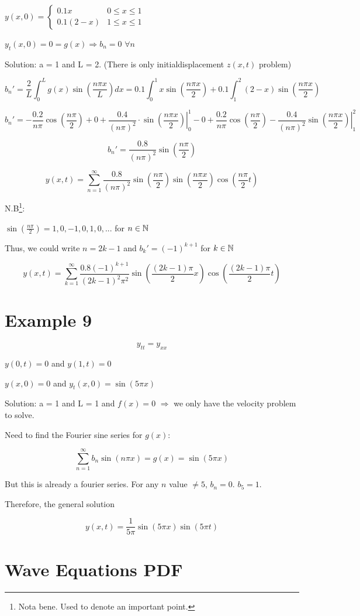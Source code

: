 \documentclass{article}
\begin{document}
$y(x,0) = \left\{ \begin{matrix} 0.1 x & 0 \leq x \leq 1 \\ 0.1(2-x) & 1 \leq x \leq 1 \end{matrix} \right.$

$y_t (x,0) = 0 = g(x) \Rightarrow b_n = 0$ $ \forall n$

Solution: a = 1 and L = 2. (There is only initialdisplacement $z(x,t)$ problem)

$$b_n' = \frac{2}{L} \int_0^L g(x) \sin \left( \frac{ n \pi x}{L} \right) dx = 0.1 \int_0^1 x \sin \left( \frac{ n \pi x}{2} \right) + 0.1\int_1^2 (2-x) \sin \left( \frac{ n \pi x}{2} \right) $$

$$b_n' = - \frac{0.2}{n \pi} \cos \left( \frac{n \pi}{2} \right) + 0 + \frac{0.4}{(n \pi)^2 } \cdot \left. \sin \left( \frac{n \pi x}{2} \right) \right|_0^1  - 0 + \frac{0.2}{n \pi} \cos( \frac{n \pi}{2}) - \frac{0.4}{(n \pi)^2} \left. \sin  \left( \frac{n \pi x}{2} \right) \right|_1^2$$

$$b_n' = \frac{0.8}{(n \pi)^2 } \sin \left( \frac{n \pi}{2} \right)$$


$$y(x,t) = \sum_{n = 1}^\infty \frac{0.8}{(n \pi)^2 } \sin \left( \frac{n \pi}{2} \right) \sin \left( \frac{n \pi x}{2} \right) \cos \left( \frac{n \pi}{2} t \right)$$

N.B\footnote{Nota bene. Used to denote an important point. }:

$\sin (\frac{n \pi}{2}) = 1,0,-1,0,1,0,...$ for $n \in \mathbb{N}$

Thus, we could write $n = 2k-1$ and $b_k' = (-1)^{k+1}$ for $k \in \mathbb{N}$

$$y(x,t) = \sum_{k  =1}^\infty \frac{0.8 (-1)^{k + 1}}{(2k-1)^2 \pi^2} \sin \left( \frac{(2k-1) \pi}{2} x \right) \cos \left( \frac{(2k-1) \pi}{2} t \right)$$

\section{Example 9}

$$y_{tt} = y_{xx}$$

$y(0,t) = 0$ and $y(1,t) = 0$

$y(x,0) = 0$ and $y_t(x,0) = \sin(5 \pi x)$

Solution: a = 1 and L = 1 and $f(x) = 0$ $\Rightarrow$ we only have the velocity problem to solve. 

Need to find the Fourier sine series for $g(x)$:

$$\sum_{n  =1}^\infty b_n \sin(n \pi x) = g(x) = \sin(5 \pi x)$$

But this is already a fourier series. For any $n$ value $\neq 5$, $b_n = 0$. $b_5 = 1$. 

Therefore, the general solution 

$$y(x,t) = \frac{1}{5 \pi} \sin (5 \pi x) \sin(5 \pi t)$$

\section{Wave Equations PDF}



\end{document}
